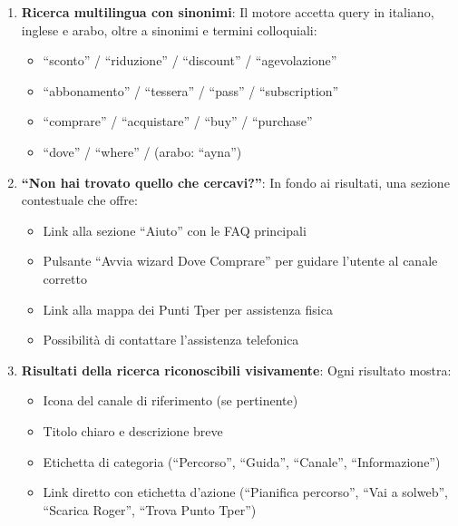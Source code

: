 \begin{tcolorbox}[colback=backgroundColor,colframe=borderColor,arc=2mm]
{\begin{enumerate}[leftmargin=*]
 \item \textbf{Ricerca multilingua con sinonimi}: Il motore accetta query in italiano, inglese e arabo, oltre a sinonimi e termini colloquiali:
 \begin{itemize}
   \item ``sconto'' / ``riduzione'' / ``discount'' / ``agevolazione''
   \item ``abbonamento'' / ``tessera'' / ``pass'' / ``subscription''
   \item ``comprare'' / ``acquistare'' / ``buy'' / ``purchase''
   \item ``dove'' / ``where'' / (arabo: ``ayna'')
 \end{itemize}

 \item \textbf{``Non hai trovato quello che cercavi?''}: In fondo ai risultati, una sezione contestuale che offre:
 \begin{itemize}
   \item Link alla sezione ``Aiuto'' con le FAQ principali
   \item Pulsante ``Avvia wizard Dove Comprare'' per guidare l'utente al canale corretto
   \item Link alla mappa dei Punti Tper per assistenza fisica
   \item Possibilità di contattare l'assistenza telefonica
 \end{itemize}

 \item \textbf{Risultati della ricerca riconoscibili visivamente}: Ogni risultato mostra:
 \begin{itemize}
   \item Icona del canale di riferimento (se pertinente)
   \item Titolo chiaro e descrizione breve
   \item Etichetta di categoria (``Percorso'', ``Guida'', ``Canale'', ``Informazione'')
   \item Link diretto con etichetta d'azione (``Pianifica percorso'', ``Vai a solweb'', ``Scarica Roger'', ``Trova Punto Tper'')
 \end{itemize}

\end{enumerate}
}
\end{tcolorbox}

\vspace{0.3cm}


